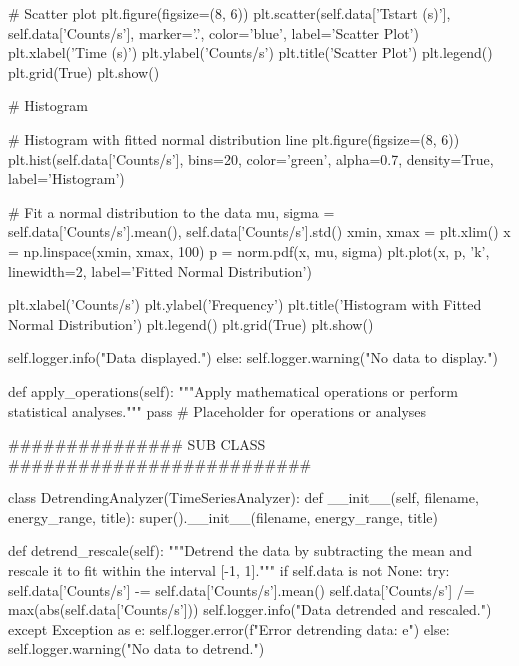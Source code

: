 \documentclass[nofootinbib,aps]{revtex4}
\begin{document}
\begin{framed}
\begin{pythoncode}[caption={main.py code}]
            # Scatter plot
            plt.figure(figsize=(8, 6))
            plt.scatter(self.data['Tstart (s)'], self.data['Counts/s'], marker='.', color='blue', label='Scatter Plot')
            plt.xlabel('Time (s)')
            plt.ylabel('Counts/s')
            plt.title('Scatter Plot')
            plt.legend()
            plt.grid(True)
            plt.show()

            # Histogram
            
            # Histogram with fitted normal distribution line
            plt.figure(figsize=(8, 6))
            plt.hist(self.data['Counts/s'], bins=20, color='green', alpha=0.7, density=True, label='Histogram')

            # Fit a normal distribution to the data
            mu, sigma = self.data['Counts/s'].mean(), self.data['Counts/s'].std()
            xmin, xmax = plt.xlim()
            x = np.linspace(xmin, xmax, 100)
            p = norm.pdf(x, mu, sigma)
            plt.plot(x, p, 'k', linewidth=2, label='Fitted Normal Distribution')

            plt.xlabel('Counts/s')
            plt.ylabel('Frequency')
            plt.title('Histogram with Fitted Normal Distribution')
            plt.legend()
            plt.grid(True)
            plt.show()

            self.logger.info("Data displayed.")
        else:
            self.logger.warning("No data to display.")

    def apply_operations(self):
        """Apply mathematical operations or perform statistical analyses."""
        pass  # Placeholder for operations or analyses



    ############### SUB CLASS ##########################

class DetrendingAnalyzer(TimeSeriesAnalyzer):
    def __init__(self, filename, energy_range, title):
        super().__init__(filename, energy_range, title)

    def detrend_rescale(self):
        """Detrend the data by subtracting the mean and rescale it to fit within the interval [-1, 1]."""
        if self.data is not None:
            try:
                self.data['Counts/s'] -= self.data['Counts/s'].mean()
                self.data['Counts/s'] /= max(abs(self.data['Counts/s']))
                self.logger.info("Data detrended and rescaled.")
            except Exception as e:
                self.logger.error(f"Error detrending data: {e}")
        else:
            self.logger.warning("No data to detrend.")


\end{pythoncode}
\end{framed}
\end{document}

